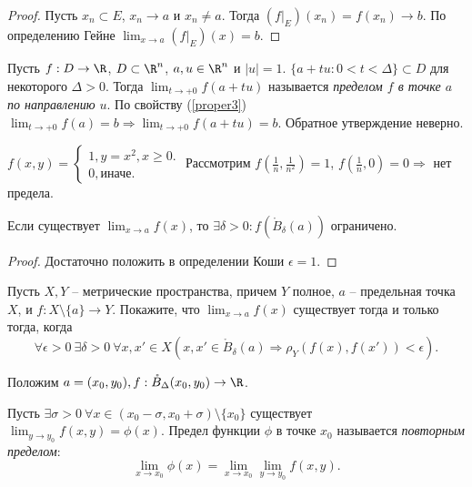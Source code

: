 \begin{proof}
    Пусть $x_{n} \subset E$, $x_{n} \to a$ и $x_{n} \neq a$. Тогда $(f|_{E})(x_{n}) = f(x_{n}) \to b$. По определению Гейне $\lim_{x \to a}(f|_{E})(x) = b$.
\end{proof}

Пусть $f: D \to \R$, $D \subset \R^{n}$, $a, u \in \R^{n}$ и $|u| = 1$.
$\{a + tu: 0 < t < \Delta\} \subset D$ для некоторого $\Delta > 0$.
Тогда $\lim_{t \to +0}f(a + tu)$ называется \textit{пределом $f$ в точке $a$ по направлению $u$}. По свойству (\ref{proper3}) $\lim_{t \to +0}f(a) = b \Rightarrow \lim_{t \to +0} f(a + tu) = b$. Обратное утверждение неверно.

\begin{example}
    $f(x, y) = \begin{cases}
    1, y = x^2, x \geq 0. \\
    0, \text{иначе}.
    \end{cases}$
    Рассмотрим $f(\frac{1}{n}, \frac{1}{n^{2}}) = 1$, $f(\frac{1}{n}, 0) = 0 \Rightarrow$ нет предела.
\end{example}

\begin{property}
    Если существует $\lim_{x \to a} f(x)$, то $\exists \delta > 0: f(\mathring{B}_{\delta}(a))$ ограничено.
\end{property}

\begin{proof}
    Достаточно положить в определении Коши $\epsilon = 1$.
\end{proof}

\begin{problem}
    Пусть $X, Y$ -- метрические пространства, причем $Y$ полное, $a$ -- предельная точка $X$, и $f: X \setminus \{a\} \to Y$. Покажите, что $\lim_{x \to a} f(x)$ существует тогда и только тогда, когда
    \[\forall \epsilon > 0 \ \exists \delta > 0 \ \forall x, x' \in X (x, x' \in \mathring{B}_{\delta}(a) \Rightarrow \rho_{Y}(f(x), f(x')) < \epsilon).\]
\end{problem}

Положим $a = (x_{0}, y_{0}), f: \mathring{B}_{\Delta}(x_{0}, y_{0}) \to \R$.
\begin{definition}
    Пусть $\exists \sigma > 0 \ \forall x \in (x_{0} - \sigma, x_{0} + \sigma) \setminus \{x_{0}\}$ существует $\lim_{y \to y_{0}} f(x, y) = \phi(x)$. Предел функции $\phi$ в точке $x_{0}$ называется \textit{повторным пределом}:
    \[\lim_{x \to x_{0}} \phi(x) = \lim_{x \to x_{0}}\lim_{y \to y_{0}}f(x, y).\]
\end{definition}

